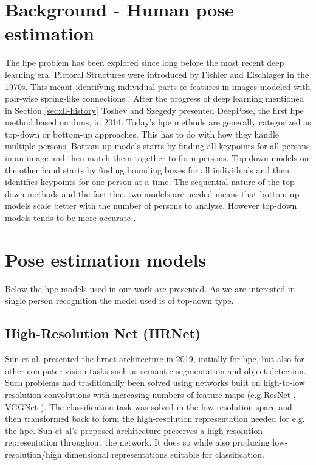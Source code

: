 \section{Background - Human pose estimation}
The \gls{hpe} problem has been explored since long before the most recent deep learning era. Pictoral Structures were introduced by Fishler and Elschlager in the 1970s. This meant identifying individual parts or features in images modeled with pair-wise spring-like connections \cite{Fischler1973}. After the progress of deep learning mentioned in Section \ref{sec:dl-history} Toshev and Szegedy \cite{Toshev2014} presented DeepPose, the first \gls{hpe} method based on \glspl{dnn}, in 2014. Today's \gls{hpe} methods are generally categorized as top-down or bottom-up approaches. This has to do with how they handle multiple persons. Bottom-up models starts by finding all keypoints for all persons in an image and then match them together to form persons. Top-down models on the other hand starts by finding bounding boxes for all individuals and then identifies keypoints for one person at a time. The sequential nature of the top-down methods and the fact that two models are needed means that bottom-up models scale better with the number of persons to analyze. However top-down models tends to be more accurate \cite{Cheng2019}.

\section{Pose estimation models}
Below the \gls{hpe} models used in our work are presented. As we are interested in single person recognition the model used is of top-down type.

\subsection{High-Resolution Net (HRNet)} \label{sec:hrnet}
Sun et al. presented the \gls{hrnet} \cite{Sun2019} architecture in 2019, initially for \gls{hpe}, but also for other computer vision tasks such as semantic segmentation and object detection. Such problems had traditionally been solved using networks built on high-to-low resolution convolutions with increasing numbers of feature maps (e.g ResNet \cite{He2016}, VGGNet \cite{Simonyan2015}). The classification task was solved in the low-resolution space and then transformed back to form the high-resolution representation needed for e.g. the \gls{hpe}. Sun et al's proposed architecture preserves a high resolution representation throughout the network. It does so while also producing low-resolution/high dimensional representations suitable for classification.

